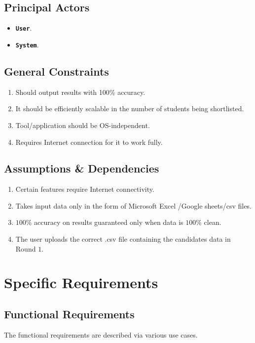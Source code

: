 \documentclass{report}
\begin{document}
\section{Principal Actors}
    \begin{itemize}
        \item \texttt{\textbf{\textcolor{TealBlue}{User}}}.
        \item \texttt{\textbf{\textcolor{TealBlue}{System}}}.
    \end{itemize}
\section{General Constraints}
\begin{enumerate}
    \item Should output results with 100\% accuracy.
    \item It should be efficiently scalable in the number of students being shortlisted.
    \item Tool/application should be OS-independent.
    \item Requires Internet connection for it to work fully.
\end{enumerate}
\section{Assumptions \& Dependencies}
\begin{enumerate}
    \item Certain features require Internet connectivity.
    \item Takes input data only in the form of Microsoft Excel /Google sheets/csv files.
    \item $100$\% accuracy on results guaranteed only when data is $100$\% clean.
    \item The user uploads the correct .csv file containing the candidates data in Round $1$.
\end{enumerate}

\chapter{Specific Requirements}
\section{Functional Requirements}
The functional requirements are described via various use cases.
\end{document}
